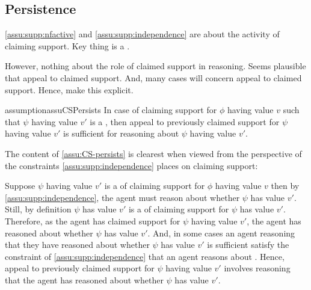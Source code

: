 \subsection{Persistence}
\label{sec:persistence}

\begin{note}
  \autoref{assu:supp:nfactive} and \autoref{assu:supp:independence} are about the activity of claiming support.
  Key thing is a \requ{}.

  However, nothing about the role of claimed support in reasoning.
  Seems plausible that appeal to claimed support.
  And, many cases will concern appeal to claimed support.
  Hence, make this explicit.
\end{note}

\begin{note}[Assumption]
  \begin{restatable}{assumption}{assuCSPersists}
    \label{assu:CS-persists}
    In case of claiming support for \(\phi\) having value \(v\) such that \(\psi\) having value \(v'\) is a \requ{}, then appeal to previously claimed support for \(\psi\) having value \(v'\) is sufficient for reasoning about \(\psi\) having value \(v'\).
  \end{restatable}
\end{note}

\begin{note}[Intuition]
  The content of \autoref{assu:CS-persists} is clearest when viewed from the perspective of the constraints \autoref{assu:supp:independence} places on claiming support:

  Suppose \(\psi\) having value \(v'\) is a \requ{} of claiming support for \(\phi\) having value \(v\) then by \autoref{assu:supp:independence}, the agent must reason about whether \(\psi\) has value \(v'\).
  Still, by definition \(\psi\) has value \(v'\) is a \requ{} of claiming support for \(\psi\) has value \(v'\).
  Therefore, as the agent has claimed support for \(\psi\) having value \(v'\), the agent has reasoned about whether \(\psi\) has value \(v'\).
  And, in some cases an agent reasoning that they have reasoned about whether \(\psi\) has value \(v'\) is sufficient satisfy the constraint of \autoref{assu:supp:independence} that an agent reasons about .
  Hence, appeal to previously claimed support for \(\psi\) having value \(v'\) involves reasoning that the agent has reasoned about whether \(\psi\) has value \(v'\).
\end{note}

